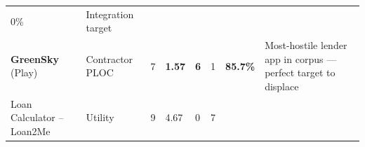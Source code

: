 \documentclass[
  10pt,
]{article}
\begin{document}
\begin{longtable}[]{@{}llllllll@{}}
\begin{minipage}[t]{0.10\columnwidth}
0\%\strut
\end{minipage} & \begin{minipage}[t]{0.10\columnwidth}\raggedright
Integration target\strut
\end{minipage}\tabularnewline
\begin{minipage}[t]{0.10\columnwidth}\raggedright
\textbf{GreenSky} (Play)\strut
\end{minipage} & \begin{minipage}[t]{0.10\columnwidth}\raggedright
Contractor PLOC\strut
\end{minipage} & \begin{minipage}[t]{0.10\columnwidth}\raggedright
7\strut
\end{minipage} & \begin{minipage}[t]{0.10\columnwidth}\raggedright
\textbf{1.57}\strut
\end{minipage} & \begin{minipage}[t]{0.10\columnwidth}\raggedright
\textbf{6}\strut
\end{minipage} & \begin{minipage}[t]{0.10\columnwidth}\raggedright
1\strut
\end{minipage} & \begin{minipage}[t]{0.10\columnwidth}\raggedright
\textbf{85.7\%}\strut
\end{minipage} & \begin{minipage}[t]{0.10\columnwidth}\raggedright
Most-hostile lender app in corpus --- perfect target to displace\strut
\end{minipage}\tabularnewline
\begin{minipage}[t]{0.10\columnwidth}\raggedright
Loan Calculator -- Loan2Me\strut
\end{minipage} & \begin{minipage}[t]{0.10\columnwidth}\raggedright
Utility\strut
\end{minipage} & \begin{minipage}[t]{0.10\columnwidth}\raggedright
9\strut
\end{minipage} & \begin{minipage}[t]{0.10\columnwidth}\raggedright
4.67\strut
\end{minipage} & \begin{minipage}[t]{0.10\columnwidth}\raggedright
0\strut
\end{minipage} & \begin{minipage}[t]{0.10\columnwidth}\raggedright
7\strut
\end{minipage} & \begin{minipage}[t]{0.10\columnwidth}\raggedright

\end{minipage}
\end{longtable}
\end{document}

